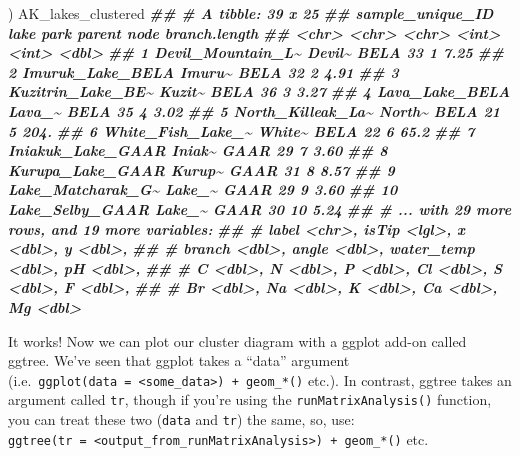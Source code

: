 \documentclass[
]{krantz}
\newenvironment{Shaded}{\begin{snugshade}}{\end{snugshade}}
\newcommand{\DocumentationTok}[1]{\textcolor[rgb]{0.56,0.35,0.01}{\textbf{\textit{#1}}}}
\newcommand{\NormalTok}[1]{#1}
\begin{document}
\begin{Shaded}
\begin{Highlighting}[]
\NormalTok{)}
\NormalTok{AK\_lakes\_clustered}
\DocumentationTok{\#\# \# A tibble: 39 x 25}
\DocumentationTok{\#\#    sample\_unique\_ID  lake   park  parent  node branch.length}
\DocumentationTok{\#\#    \textless{}chr\textgreater{}             \textless{}chr\textgreater{}  \textless{}chr\textgreater{}  \textless{}int\textgreater{} \textless{}int\textgreater{}         \textless{}dbl\textgreater{}}
\DocumentationTok{\#\#  1 Devil\_Mountain\_L\textasciitilde{} Devil\textasciitilde{} BELA      33     1          7.25}
\DocumentationTok{\#\#  2 Imuruk\_Lake\_BELA  Imuru\textasciitilde{} BELA      32     2          4.91}
\DocumentationTok{\#\#  3 Kuzitrin\_Lake\_BE\textasciitilde{} Kuzit\textasciitilde{} BELA      36     3          3.27}
\DocumentationTok{\#\#  4 Lava\_Lake\_BELA    Lava\_\textasciitilde{} BELA      35     4          3.02}
\DocumentationTok{\#\#  5 North\_Killeak\_La\textasciitilde{} North\textasciitilde{} BELA      21     5        204.  }
\DocumentationTok{\#\#  6 White\_Fish\_Lake\_\textasciitilde{} White\textasciitilde{} BELA      22     6         65.2 }
\DocumentationTok{\#\#  7 Iniakuk\_Lake\_GAAR Iniak\textasciitilde{} GAAR      29     7          3.60}
\DocumentationTok{\#\#  8 Kurupa\_Lake\_GAAR  Kurup\textasciitilde{} GAAR      31     8          8.57}
\DocumentationTok{\#\#  9 Lake\_Matcharak\_G\textasciitilde{} Lake\_\textasciitilde{} GAAR      29     9          3.60}
\DocumentationTok{\#\# 10 Lake\_Selby\_GAAR   Lake\_\textasciitilde{} GAAR      30    10          5.24}
\DocumentationTok{\#\# \# ... with 29 more rows, and 19 more variables:}
\DocumentationTok{\#\# \#   label \textless{}chr\textgreater{}, isTip \textless{}lgl\textgreater{}, x \textless{}dbl\textgreater{}, y \textless{}dbl\textgreater{},}
\DocumentationTok{\#\# \#   branch \textless{}dbl\textgreater{}, angle \textless{}dbl\textgreater{}, water\_temp \textless{}dbl\textgreater{}, pH \textless{}dbl\textgreater{},}
\DocumentationTok{\#\# \#   C \textless{}dbl\textgreater{}, N \textless{}dbl\textgreater{}, P \textless{}dbl\textgreater{}, Cl \textless{}dbl\textgreater{}, S \textless{}dbl\textgreater{}, F \textless{}dbl\textgreater{},}
\DocumentationTok{\#\# \#   Br \textless{}dbl\textgreater{}, Na \textless{}dbl\textgreater{}, K \textless{}dbl\textgreater{}, Ca \textless{}dbl\textgreater{}, Mg \textless{}dbl\textgreater{}}
\end{Highlighting}
\end{Shaded}

It works! Now we can plot our cluster diagram with a ggplot add-on called ggtree. We've seen that ggplot takes a ``data'' argument (i.e.~\texttt{ggplot(data\ =\ \textless{}some\_data\textgreater{})\ +\ geom\_*()} etc.). In contrast, ggtree takes an argument called \texttt{tr}, though if you're using the \texttt{runMatrixAnalysis()} function, you can treat these two (\texttt{data} and \texttt{tr}) the same, so, use: \texttt{ggtree(tr\ =\ \textless{}output\_from\_runMatrixAnalysis\textgreater{})\ +\ geom\_*()} etc.
\end{document}
